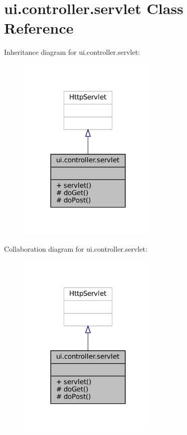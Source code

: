 \hypertarget{classui_1_1controller_1_1servlet}{}\section{ui.\+controller.\+servlet Class Reference}
\label{classui_1_1controller_1_1servlet}


Inheritance diagram for ui.\+controller.\+servlet\+:
\nopagebreak
\begin{figure}[H]
\begin{center}
\leavevmode
\includegraphics[width=191pt]{classui_1_1controller_1_1servlet__inherit__graph}
\end{center}
\end{figure}


Collaboration diagram for ui.\+controller.\+servlet\+:
\nopagebreak
\begin{figure}[H]
\begin{center}
\leavevmode
\includegraphics[width=191pt]{classui_1_1controller_1_1servlet__coll__graph}
\end{center}
\end{figure}
